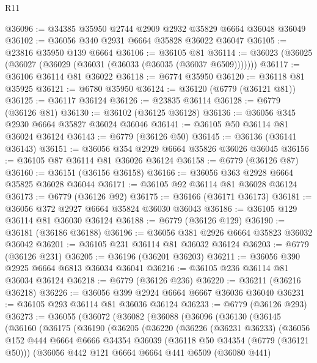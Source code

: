 \begin{lexlean}{R11}
\begin{coremodule}
@36096 := @34385 @35950 @2744 @2909 @2932 @35829 @6664 @36048 @36049
@36102 := @36056 @340 @2931 @6664 @35828 @36022 @36047
@36105 := @23816 @35950 @139 @6664
@36106 := @36105 @81
@36114 := @36023 (@36025 (@36027 (@36029 (@36031 (@36033 (@36035 (@36037 @6509)))))))
@36117 := @36106 @36114 @81 @36022
@36118 := @6774 @35950
@36120 := @36118 @81 @35925
@36121 := @6780 @35950
@36124 := @36120 (@6779 (@36121 @81))
@36125 := @36117 @36124
@36126 := @23835 @36114
@36128 := @6779 (@36126 @81)
@36130 := @36102 (@36125 @36128)
@36136 := @36056 @345 @2930 @6664 @35827 @36024 @36046
@36141 := @36105 @50 @36114 @81 @36024 @36124
@36143 := @6779 (@36126 @50)
@36145 := @36136 (@36141 @36143)
@36151 := @36056 @354 @2929 @6664 @35826 @36026 @36045
@36156 := @36105 @87 @36114 @81 @36026 @36124
@36158 := @6779 (@36126 @87)
@36160 := @36151 (@36156 @36158)
@36166 := @36056 @363 @2928 @6664 @35825 @36028 @36044
@36171 := @36105 @92 @36114 @81 @36028 @36124
@36173 := @6779 (@36126 @92)
@36175 := @36166 (@36171 @36173)
@36181 := @36056 @372 @2927 @6664 @35824 @36030 @36043
@36186 := @36105 @129 @36114 @81 @36030 @36124
@36188 := @6779 (@36126 @129)
@36190 := @36181 (@36186 @36188)
@36196 := @36056 @381 @2926 @6664 @35823 @36032 @36042
@36201 := @36105 @231 @36114 @81 @36032 @36124
@36203 := @6779 (@36126 @231)
@36205 := @36196 (@36201 @36203)
@36211 := @36056 @390 @2925 @6664 @6813 @36034 @36041
@36216 := @36105 @236 @36114 @81 @36034 @36124
@36218 := @6779 (@36126 @236)
@36220 := @36211 (@36216 @36218)
@36226 := @36056 @399 @2924 @6664 @6667 @36036 @36040
@36231 := @36105 @293 @36114 @81 @36036 @36124
@36233 := @6779 (@36126 @293)
@36273 := @36055
    (@36072
      (@36082
        (@36088
          (@36096
            (@36130
              (@36145
                (@36160
                  (@36175
                    (@36190
                      (@36205
                        (@36220
                          (@36226
                            (@36231 @36233)
                            (@36056
                              @152
                              @444
                              @6664
                              @6666
                              @34354
                              @36039
                              (@36118 @50 @34354 (@6779 (@36121 @50)))
                              (@36056
                                @442
                                @121
                                @6664
                                @6664
                                @441
                                @6509
                                (@36080 @441)

\end{coremodule}
\end{lexlean}
